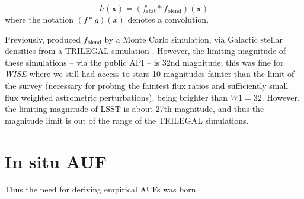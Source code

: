 \documentclass[fleqn,usenatbib]{mnras}
\begin{document}
\begin{equation}
h(\textbf{x}) = (f_\mathrm{stat} * f_\mathrm{blend})(\textbf{x})
\end{equation}
where the notation $(f * g)(x)$ denotes a convolution.

Previously, \citet{2018MNRAS.481.2148W} produced $f_\mathrm{blend}$ by a Monte Carlo simulation, via Galactic stellar densities from a TRILEGAL simulation \citep{Girardi2005}. However, the limiting magnitude of these simulations -- via the public API -- is 32nd magnitude; this was fine for \textit{WISE} where we still had access to stars 10 magnitudes fainter than the limit of the survey (necessary for probing the faintest flux ratios and sufficiently small flux weighted astrometric perturbations), being brighter than $W1=32$. However, the limiting magnitude of LSST is about 27th magnitude, and thus the magnitude limit is out of the range of the TRILEGAL simulations.

\section{In situ AUF}
Thus the need for deriving empirical AUFs was born. 







\bsp	%
\label{lastpage}
\end{document}
